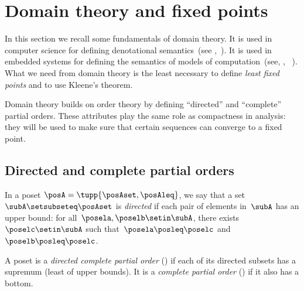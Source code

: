 
\section{Domain theory and fixed points}
\label{sec:Monotonicity-and-fixed}

In this section we recall some fundamentals of domain theory.
It is used in computer science for defining denotational semantics~(see \eg,~\cite{manes86}).
It is used in embedded systems for defining the semantics of models of computation~(see, \eg, ~\cite{lee10}).
What we need from domain theory is the least necessary to define \emph{least fixed points} and to use Kleene's theorem.

Domain theory builds on order theory by defining ``directed'' and ``complete'' partial orders.
These attributes play the same role as compactness in analysis: they will be used to make sure that certain sequences can converge to a fixed point.

\subsection{Directed and complete partial orders}

\begin{definition}
    \label{def:directed-set}
    In a poset $\posA = \tupp{\posAset, \posAleq}$, we say that a set~$\subA\setsubseteq\posAset$ is \emph{directed} if each pair of elements in~$\subA$ has an upper bound: for all~$\posela,\poselb \setin \subA$, there exists~$\poselc\setin \subA$ such that~$\posela\posleq \poselc$ and~$\poselb\posleq \poselc$.
\end{definition}


\begin{definition}[Completeness]
    \label{def:cpo}
    A poset is a \emph{directed complete partial order} (\DCPO) if each of its directed subsets has a supremum (least of upper bounds).
    It is a \emph{complete partial order} (\CPO) if it also has a bottom.
\end{definition}


